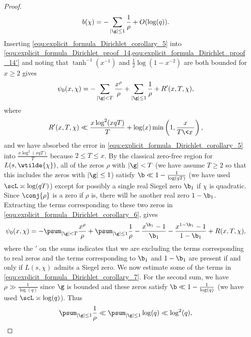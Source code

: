 \begin{proof}
        \begin{equation}\label{equ:explicit_formula_Dirichlet_corollary_5}
          b(\chi) = -\sum_{|\g| \le 1}\frac{1}{\rho}+O(\log(q)).
        \end{equation}
        Inserting \cref{equ:explicit_formula_Dirichlet_corollary_5} into \cref{equ:explicit_formula_Dirichlet_proof_14,equ:explicit_formula_Dirichlet_proof_14'} and noting that $\tanh^{-1}(x^{-1})$ and $\frac{1}{2}\log(1-x^{-2})$ are both bounded for $x \ge 2$ gives
        \begin{equation}\label{equ:explicit_formula_Dirichlet_corollary_6}
          \psi_{0}(x,\chi) = -\sum_{|\g| < T}\frac{x^{\rho}}{\rho}+\sum_{|\g| \le 1}\frac{1}{\rho}+R'(x,T,\chi),
        \end{equation}
        where
        \[
          R'(x,T,\chi) \ll \frac{x\log^{2}(xqT)}{T}+\log(x)\min\left(1,\frac{x}{T\<x\>}\right),
        \]
        and we have absorbed the error in \cref{equ:explicit_formula_Dirichlet_corollary_5} into $\frac{x\log^{2}(xqT)}{T}$ because $2 \le T \le x$. By the classical zero-free region for $L(s,\wtilde{\chi})$, all of the zeros $\rho$ with $|\g| < T$ (we have assume $T \ge 2$ so that this includes the zeros with $|\g| \le 1$) satisfy $\b \ll 1-\frac{1}{\log(qT)}$ (we have used $\scL \asymp \log(qT)$) except for possibly a single real Siegel zero $\b_{1}$ if $\chi$ is quadratic. Since $\conj{\rho}$ is a zero if $\rho$ is, there will be another real zero $1-\b_{1}$. Extracting the terms corresponding to these two zeros in \cref{equ:explicit_formula_Dirichlet_corollary_6}, gives
        \begin{equation}\label{equ:explicit_formula_Dirichlet_corollary_7}
          \psi_{0}(x,\chi) = -\psum_{|\g| < T}\frac{x^{\rho}}{\rho}+\psum_{|\g| \le 1}\frac{1}{\rho}-\frac{x^{\b_{1}}-1}{\b_{1}}-\frac{x^{1-\b_{1}}-1}{1-\b_{1}}+R(x,T,\chi),
        \end{equation}
        where the $'$ on the sums indicates that we are excluding the terms corresponding to real zeros and the terms corresponding to $\b_{1}$ and $1-\b_{1}$ are present if and only if $L(s,\chi)$ admits a Siegel zero. We now estimate some of the terms in \cref{equ:explicit_formula_Dirichlet_corollary_7}. For the second sum, we have $\rho \gg \frac{1}{\log(q)}$ since $\g$ is bounded and these zeros satisfy $\b \ll 1-\frac{1}{\log(q)}$ (we have used $\scL \asymp \log(q)$). Thus
        \begin{equation}\label{equ:explicit_formula_Dirichlet_corollary_8}
          \psum_{|\g| \le 1}\frac{1}{\rho} \ll \psum_{|\g| \le 1}\log(q) \ll \log^{2}(q),

\end{equation}
\end{proof}
